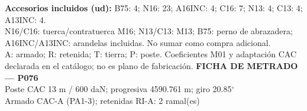 \begingroup\scriptsize
\textbf{Accesorios incluidos (ud):} B75: 4; N16: 23; A16INC: 4; C16: 7; N13: 4; C13: 4; A13INC: 4.\\
N16/C16: tuerca/contratuerca M16; N13/C13: M13; B75: perno de abrazadera; A16INC/A13INC: arandelas incluidas. No sumar como compra adicional.\\
A: armado; R: retenida; T: tierra; P: poste. Coeficientes M01 y adaptación CAC declarada en el catálogo; no es plano de fabricación.
\endgroup\endgroup
\clearpage{}
\begingroup\small\setlength{\parskip}{3pt}\renewcommand{\arraystretch}{1.05}
\textbf{\large FICHA DE METRADO — P076}\\[4pt]
Poste CAC 13 m / 600 daN; progresiva 4590.761 m; giro 20.85\ensuremath{^\circ}\\
Armado CAC-A (PA1-3); retenidas RI-A: 2 ramal(es)\\
\begingroup\scriptsize
